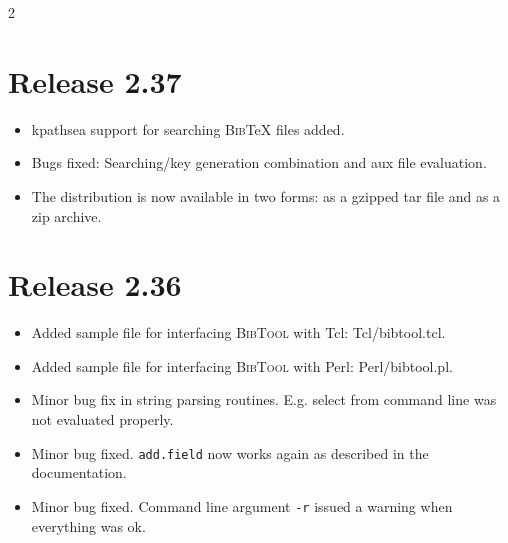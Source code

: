 \documentclass[11pt,a4paper]{scrartcl}
\newcommand\Arg[1]{\texttt{#1}}
\newcommand\rsc[1]{\texttt{#1}}
\newcommand\File[1]{\textsf{#1}}
\newcommand\BibTool{\textsc{BibTool}}
\newcommand\BibTeX{\textsc{Bib}\TeX}
\newenvironment{Releases}{\begin{multicols}2\RaggedRight}{\end{multicols}}
\newenvironment{Release}[2]{%
  \def\tmp{#2}%
  \section*{Release #1 \ifx\tmp\empty\else{\normalsize[#2]}\fi}
  \begin{itemize}
}{\end{itemize}}
\newenvironment{Fix}[1]{\item }{}
\newenvironment{New}[1]{\item }{}
\begin{document}
\begin{Releases}
 \begin{Release}{2.37}{}
  \begin{New}{gene}
    kpathsea support for searching \BibTeX{} files added.
  \end{New}
  \begin{Fix}{gene}
    Bugs fixed: Searching/key generation combination and aux file evaluation.
  \end{Fix}
  \begin{New}{gene}
    The distribution is now available in two forms: as a gzipped tar file and
    as a zip archive.
  \end{New}
 \end{Release}

 \begin{Release}{2.36}{}
  \begin{New}{gene}
    Added sample file for interfacing \BibTool{} with Tcl:
    \File{Tcl/bibtool.tcl}.
  \end{New}
  \begin{New}{gene}
    Added sample file for interfacing \BibTool{} with Perl:
    \File{Perl/bibtool.pl}.
  \end{New}
  \begin{Fix}{gene}
    Minor bug fix in string parsing routines. E.g. select from command line
    was not evaluated properly.
  \end{Fix}
  \begin{Fix}{gene}
    Minor bug fixed. \rsc{add.field} now works again as described in
    the documentation.
  \end{Fix}
  \begin{Fix}{gene}
    Minor bug fixed. Command line argument \Arg{-r} issued a warning
    when everything was ok.
  \end{Fix}
 \end{Release}


\end{Releases}
\end{document}
